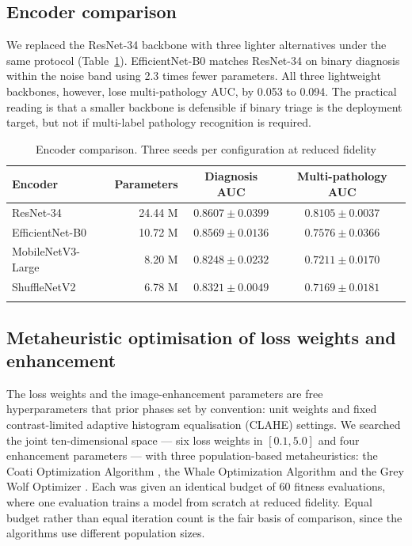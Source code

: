 \documentclass[pdflatex,sn-mathphys-num]{sn-jnl}
\theoremstyle{thmstyleone}%
\theoremstyle{thmstyletwo}%
\theoremstyle{thmstylethree}%
\begin{document}
\subsection{Encoder comparison}\label{subsec:encoders}

We replaced the ResNet-34 backbone with three lighter alternatives under the same protocol
(Table~\ref{tab:encoders}). EfficientNet-B0 \cite{bib_efficientnet} matches ResNet-34 on binary
diagnosis within the noise band using 2.3 times fewer parameters. All three lightweight
backbones, however, lose multi-pathology AUC, by 0.053 to 0.094. The practical reading is that a
smaller backbone is defensible if binary triage is the deployment target, but not if multi-label
pathology recognition is required.

\begin{table}[h]
\caption{Encoder comparison. Three seeds per configuration at reduced fidelity}\label{tab:encoders}%
\begin{tabular*}{\textwidth}{@{\extracolsep\fill}lrcc}
\toprule
Encoder & Parameters & Diagnosis AUC & Multi-pathology AUC \\
\midrule
ResNet-34 \cite{bib_resnet}            & 24.44 M & $\mathbf{0.8607 \pm 0.0399}$ & $\mathbf{0.8105 \pm 0.0037}$ \\
EfficientNet-B0 \cite{bib_efficientnet} & 10.72 M & $0.8569 \pm 0.0136$ & $0.7576 \pm 0.0366$ \\
MobileNetV3-Large \cite{bib_mobilenet}  &  8.20 M & $0.8248 \pm 0.0232$ & $0.7211 \pm 0.0170$ \\
ShuffleNetV2 \cite{bib_shufflenet}      &  6.78 M & $0.8321 \pm 0.0049$ & $0.7169 \pm 0.0181$ \\
\botrule
\end{tabular*}
\end{table}

\subsection{Metaheuristic optimisation of loss weights and enhancement}\label{subsec:optim}

The loss weights and the image-enhancement parameters are free hyperparameters that prior phases
set by convention: unit weights and fixed contrast-limited adaptive histogram equalisation
(CLAHE) settings. We searched the joint ten-dimensional space --- six loss weights in $[0.1,
5.0]$ and four enhancement parameters --- with three population-based metaheuristics: the Coati
Optimization Algorithm \cite{bib_coa}, the Whale Optimization Algorithm \cite{bib_woa} and the
Grey Wolf Optimizer \cite{bib_gwo}. Each was given an identical budget of 60 fitness
evaluations, where one evaluation trains a model from scratch at reduced fidelity. Equal budget
rather than equal iteration count is the fair basis of comparison, since the algorithms use
different population sizes.
\end{document}
